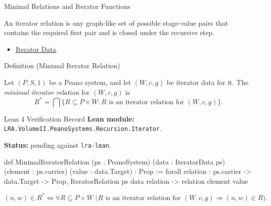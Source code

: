 \begin{topicbox}{Minimal Relations and Iterator Functions}
\begin{remark*}[Interpretation]
An iterator relation is any graph-like set of possible stage-value pairs that
contains the required first pair and is closed under the recursive step.
\end{remark*}

\begin{dependencies}
\begin{itemize}
  \item \hyperref[def:iterator-data-on-peano-system]{Iterator Data}
\end{itemize}
\end{dependencies}

\begin{definitionbox}{Definition (Minimal Iterator Relation)}
\begin{definition}
\label{def:minimal-iterator-relation}
Let $(P,S,1)$ be a Peano system, and let $(W,c,g)$ be iterator data for it.
The \emph{minimal iterator relation} for $(W,c,g)$ is
\[
R^*
=
\bigcap\{R\subseteq P\times W : R \text{ is an iterator relation for }
(W,c,g)\}.
\]
\end{definition}
\end{definitionbox}

\begin{formalizationrecord}{Lean 4 Verification Record}
\textbf{Lean module:} \texttt{LRA.VolumeII.PeanoSystems.Recursion.Iterator}.\par
{}
\textbf{Status:} pending against \texttt{lra-lean}.\par

\begin{leancode}
def MinimalIteratorRelation
    (ps : PeanoSystem)
    (data : IteratorData ps)
    (element : ps.carrier)
    (value : data.Target) : Prop :=
  forall relation : ps.carrier -> data.Target -> Prop,
    IteratorRelation ps data relation ->
    relation element value
\end{leancode}
\end{formalizationrecord}

\begin{remark*}
\[
(n,w)\in R^*
\Longleftrightarrow
\forall R\subseteq P\times W\;
\bigl(R \text{ is an iterator relation for } (W,c,g)
\Longrightarrow (n,w)\in R\bigr).
\]
\end{remark*}


\end{topicbox}
